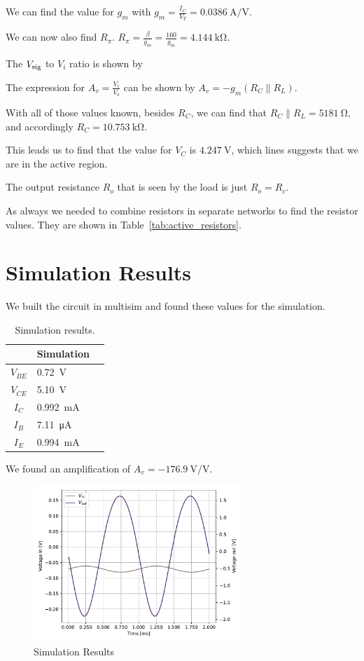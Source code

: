 \documentclass{../../ece-report}
\begin{document}
We can find the value for $g_m$ with $g_m = \frac{I_C}{V_T} = 0.0386~\si{\A/\V}$.

We can now also find $R_{\pi}$. $R_{\pi} = \frac{\beta}{g_m} = \frac{160}{g_m} = 4.144~\si{\kohm}$.

The $V_\textnormal{sig}$ to $V_i$ ratio is shown by 

The expression for $A_v = \frac{V_i}{V_o}$ can be shown by $A_v = -g_m (R_C \| R_L)$.

With all of those values known, besides $R_C$, we can find that $R_C \| R_L = 5181~\si{\ohm}$, and
accordingly $R_C = 10.753~\si{\kohm}$.

This leads us to find that the value for $V_C$ is $4.247~\si{\V}$, which lines suggests that
we are in the active region.

The output resistance $R_o$ that is seen by the load
is just $R_o = R_c$.

As always we needed to combine resistors in separate
networks to find the resistor values. They are shown
in Table~\ref{tab:active_resistors}.


\section*{Simulation Results}

We built the circuit in multisim and found these values for the simulation.



\begin{table}[h!]
  \centering
  \begin{tabular}{c l l}
      & \textbf{Simulation} \\
\midrule
    $V_{BE}$  & 0.72~\si{\V}  \\
    $V_{CE}$  & 5.10~\si{\V}  \\
    $I_C$     & 0.992~\si{\mA} \\
    $I_B$     & 7.11~\si{\uA}  \\
    $I_E$     & 0.994~\si{\mA} \\
\bottomrule
\end{tabular}
\caption{Simulation results.}
\label{tab:sim_results}
\end{table}

We found an amplification of $A_v = -176.9~\si{\V/\V}$.

\begin{figure}[h!]
  \centering
  \includegraphics[width=0.7\textwidth]{../plots/pdf/simulation.pdf}
  \caption{Simulation Results}
  \label{fig:sim_results}
\end{figure}
\end{document}
